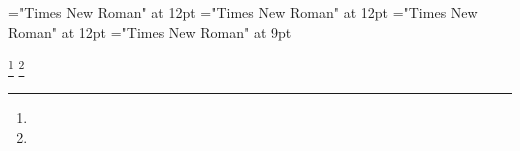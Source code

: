 \documentclass[a4paper]{article}
\begin{document}
 
\pagestyle{plain} 
\font\scriptureTextscrBody="Times New Roman" at 12pt
\font\sectionscriptureTextscrBody="Times New Roman" at 12pt
\font\psectionscriptureTextscrBody="Times New Roman" at 12pt
\font\footnotepsectionscriptureTextscrBody="Times New Roman" at 9pt

\pagestyle{fancy} 

 \footnote { }  \footnote { } 
\end{document}
